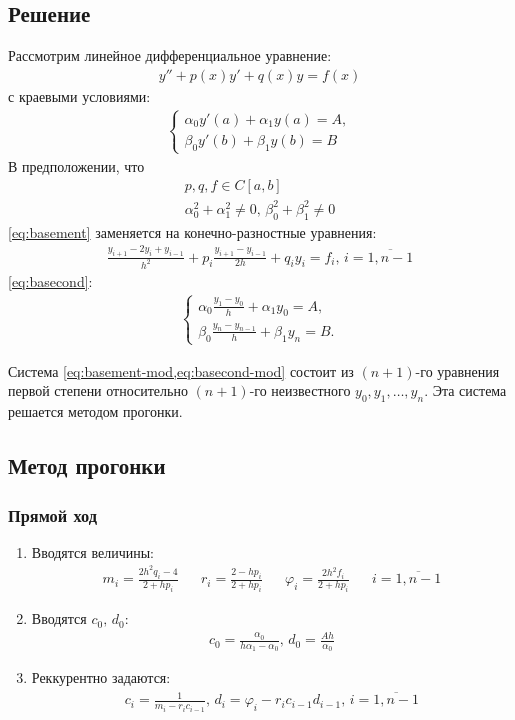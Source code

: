 \subsection{Решение}
Рассмотрим линейное дифференциальное уравнение:
\begin{align}\label{eq:basement}
	y''+p(x)y'+q(x)y=f(x)
\end{align}
с краевыми условиями:
\begin{align}
	\begin{cases}
		\alpha_0y'(a)+\alpha_1y(a)=A, \\
		\beta_0y'(b)+\beta_1y(b)=B
	\end{cases}
\end{align}
В предположении, что
\begin{align}\label{eq:basecond}
	p, q, f \in C[a,b] \\
	\alpha_0^2+\alpha_1^2\neq0,\, \beta_0^2+\beta_1^2\neq0
\end{align}
\cref{eq:basement} заменяется на конечно-разностные уравнения:
\begin{align}\label{eq:basement-mod}
  \frac{y_{i+1}-2y_i+y_{i-1}}{h^2}+p_i\frac{y_{i+1}-y_{i-1}}{2h}+q_iy_i=f_i,\, i=\overline{1,n-1}
\end{align}
\cref{eq:basecond}:
\begin{align}
  \begin{cases}\label{eq:basecond-mod}
    \alpha_0\frac{y_1-y_0}{h}+\alpha_1y_0=A,\\
    \beta_0\frac{y_n-y_{n-1}}{h}+\beta_1y_n=B.
  \end{cases}
\end{align}

Система \cref{eq:basement-mod,eq:basecond-mod} состоит из \((n+1)\)-го уравнения первой степени относительно \((n+1)\)-го неизвестного \(y_0,y_1,\dots,y_n\). Эта система решается методом прогонки.
\subsection{Метод прогонки}
\subsubsection{Прямой ход}
\begin{enumerate}
  \item Вводятся величины:
    \begin{align}
      m_i=\frac{2h^2q_i-4}{2+hp_i} && r_i=\frac{2-hp_i}{2+hp_i} && \varphi_i=\frac{2h^2f_i}{2+hp_i} && i = \overline{1,n-1}
    \end{align}
  \item Вводятся \(c_0,\, d_0\):
    \begin{align}
      c_0=\frac{\alpha_0}{h\alpha_1-\alpha_0},\, d_0=\frac{Ah}{\alpha_0}
    \end{align}
  \item Реккурентно задаются:
    \begin{align}
      c_i=\frac{1}{m_i-r_ic_{i-1}},\,d_i=\varphi_i-r_ic_{i-1}d_{i-1},\,i=\overline{1,n-1}
    \end{align}
\end{enumerate}
